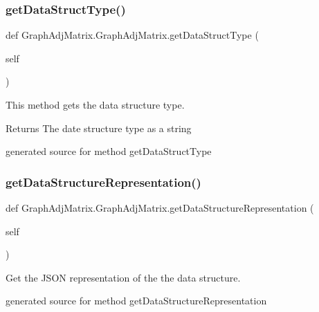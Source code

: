 \subsubsection{\texorpdfstring{get\+Data\+Struct\+Type()}{getDataStructType()}}
{\footnotesize\ttfamily def Graph\+Adj\+Matrix.\+Graph\+Adj\+Matrix.\+get\+Data\+Struct\+Type (\begin{DoxyParamCaption}\item[{}]{self }\end{DoxyParamCaption})}



This method gets the data structure type. 

\begin{DoxyReturn}{Returns}
The date structure type as a string\begin{DoxyVerb}generated source for method getDataStructType \end{DoxyVerb}
 
\end{DoxyReturn}
\hypertarget{class_graph_adj_matrix_1_1_graph_adj_matrix_a1e44a6961936900a35b6e812940fbfa8}{}\label{class_graph_adj_matrix_1_1_graph_adj_matrix_a1e44a6961936900a35b6e812940fbfa8} 
\subsubsection{\texorpdfstring{get\+Data\+Structure\+Representation()}{getDataStructureRepresentation()}}
{\footnotesize\ttfamily def Graph\+Adj\+Matrix.\+Graph\+Adj\+Matrix.\+get\+Data\+Structure\+Representation (\begin{DoxyParamCaption}\item[{}]{self }\end{DoxyParamCaption})}



Get the J\+S\+ON representation of the the data structure. 

\begin{DoxyVerb}generated source for method getDataStructureRepresentation \end{DoxyVerb}
 \hypertarget{class_graph_adj_matrix_1_1_graph_adj_matrix_a24dbf5218e61389b10fc969dcff5d7b0}{}\label{class_graph_adj_matrix_1_1_graph_adj_matrix_a24dbf5218e61389b10fc969dcff5d7b0} 
